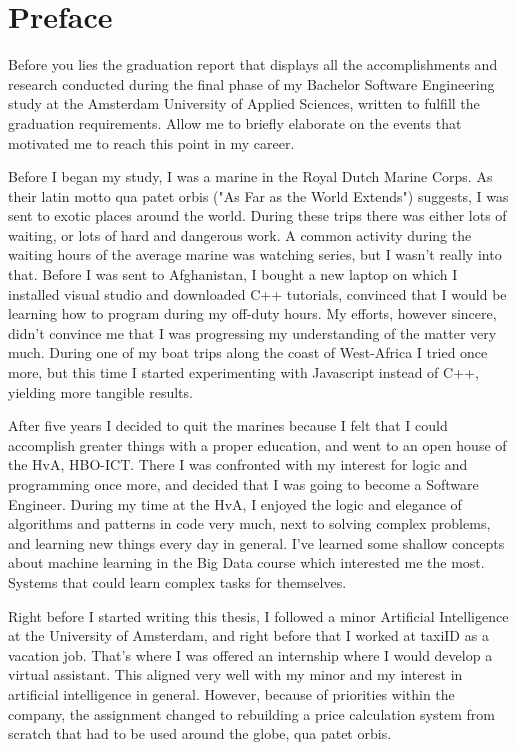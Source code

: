 %
\section*{Preface}
Before you lies the graduation report that displays all the accomplishments and research conducted during the final phase of my Bachelor Software Engineering study at the Amsterdam University of Applied Sciences, written to fulfill the graduation requirements. Allow me to briefly elaborate on the events that motivated me to reach this point in my career.

Before I began my study, I was a marine in the Royal Dutch Marine Corps. As their latin motto qua patet orbis ("As Far as the World Extends") suggests, I was sent to exotic places around the world. During these trips there was either lots of waiting, or lots of hard and dangerous work. A common activity during the waiting hours of the average marine was watching series, but I wasn’t really into that. Before I was sent to Afghanistan, I bought a new laptop on which I installed visual studio and downloaded C++ tutorials, convinced that I would be learning how to program during my off-duty hours. My efforts, however sincere, didn't convince me that I was progressing my understanding of the matter very much. During one of my boat trips along the coast of West-Africa I tried once more, but this time I started experimenting with Javascript instead of C++, yielding more tangible results.

After five years I decided to quit the marines because I felt that I could accomplish greater things with a proper education, and went to an open house of the HvA, HBO-ICT. There I was confronted with my interest for logic and programming once more, and decided that I was going to become a Software Engineer. During my time at the HvA, I enjoyed the logic and elegance of algorithms and patterns in code very much, next to solving complex problems, and learning new things every day in general. I’ve learned some shallow concepts about machine learning in the Big Data course which interested me the most. Systems that could learn complex tasks for themselves.

Right before I started writing this thesis, I followed a minor Artificial Intelligence at the University of Amsterdam, and right before that I worked at taxiID as a vacation job. That’s where I was offered an internship where I would develop a virtual assistant. This aligned very well with my minor and my interest in artificial intelligence in general. However, because of priorities within the company, the assignment changed to rebuilding a price calculation system from scratch that had to be used around the globe, qua patet orbis.

